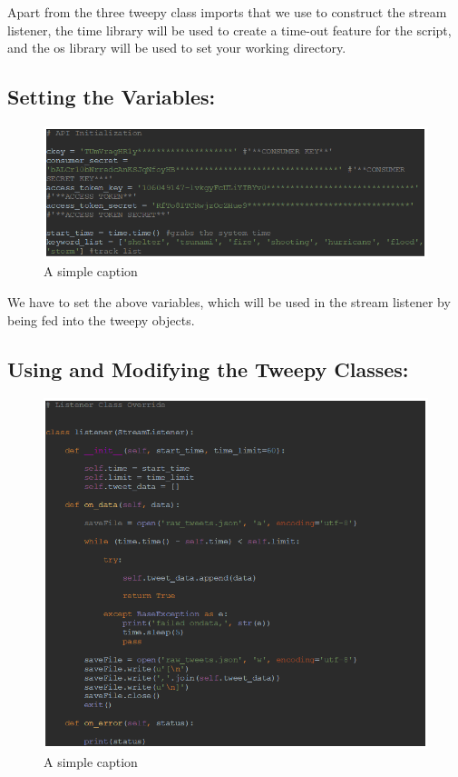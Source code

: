 Apart from the three tweepy class imports that we use to construct the stream listener, the time library will be used to create a time-out feature for the script, and the os library will be used to set your working directory.

\subsection{Setting the Variables:}

\begin{figure}[ht!]
	\centering
	\includegraphics[width=150mm]{code2.png}
	\caption{A simple caption \label{overflow}}
\end{figure}

We have to set the above variables, which will be used in the stream listener by being fed into the tweepy objects.

\subsection{Using and Modifying the Tweepy Classes:}

\begin{figure}[ht!]
	\centering
	\includegraphics[width=150mm]{code3.png}
	\caption{A simple caption \label{overflow}}
\end{figure}

